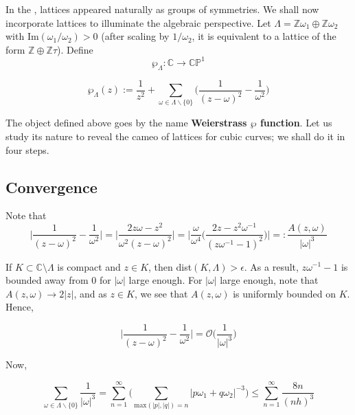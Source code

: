 \documentclass[11pt,a4paper]{article}
\begin{document}

In the , lattices appeared naturally as groups of symmetries. We shall now incorporate lattices to illuminate the algebraic perspective. Let $\Lambda = \mathbb{Z}\omega_1\oplus \mathbb{Z}\omega_2$ with $\text{Im}(\omega_1/\omega_2) >0$ (after scaling by $1/\omega_2$, it is equivalent to a lattice of the form $\mathbb{Z}\oplus\mathbb{Z}\tau$). Define
$$\wp_{\Lambda} : \mathbb{C} \rightarrow \mathbb{CP}^1$$


$$\wp_{\Lambda}(z) := \frac{1}{z^2} + \sum_{\omega \in \Lambda\backslash \{0\}}\bigg(\frac{1}{(z-\omega)^2} - \frac{1}{\omega^2}\bigg)$$

The object defined above goes by the name \textbf{Weierstrass $\wp$ function}. Let us study its nature to reveal the cameo of lattices for cubic curves; we shall do it in four steps.

\subsection*{Convergence} Note that
$$\bigg|\frac{1}{(z-\omega)^2} - \frac{1}{\omega^2}\bigg| = \bigg|\frac{2z\omega - z^2}{\omega^2(z-\omega)^2}\bigg| = \bigg|\frac{\omega}{\omega^4}\bigg(\frac{2z-z^2\omega^{-1}}{(z\omega^{-1} - 1)^2}\bigg)\bigg| =: \frac{A(z,\omega)}{|\omega|^3}$$

If $K\subset\mathbb C\setminus\Lambda$ is compact and $z\in K$, then dist$(K, \Lambda) > \epsilon$. As a result, $z\omega^{-1} - 1$ is bounded away from $0$ for $|\omega|$ large enough. For $|\omega|$ large enough, note that $A(z, \omega) \to 2|z|$, and as $z\in K$, we see that $A(z, \omega)$ is uniformly bounded on $K$. Hence,

$$\bigg|\frac{1}{(z-\omega)^2} - \frac{1}{\omega^2}\bigg| = \mathcal{O}\bigg(\frac{1}{|\omega|^3}\bigg)$$

Now,

$$\sum_{\omega \in \Lambda\backslash \{0\}} \frac{1}{|\omega|^3} = \sum_{n=1}^{\infty}\Bigg(\sum_{\text{max}(|p|, |q|) = n} |p\omega_1 + q\omega_2|^{-3}\Bigg) \leq \sum_{n = 1}^{\infty}\frac{8n}{(nh)^3}$$
\end{document}
